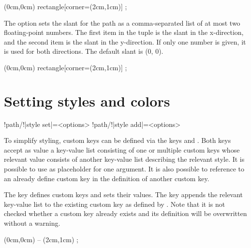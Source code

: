 \documentclass[a4paper]{article}
\begin{document}
{{\begin{codeexamplecolumns}
\begin{qdraw}
  \stroke[rotate={20}]
    (0cm,0cm) rectangle[corner={(2cm,1cm)}] ;
\end{qdraw}
\end{codeexamplecolumns}

The option  sets the slant for the path as a comma-separated list of at most two floating-point numbers. The first item in the tuple is the slant in the x-direction, and the second item is the slant in the y-direction. If only one number is given, it is used for both directions. The default slant is (\num{0}, \num{0}).

\begin{codeexamplecolumns}
\begin{qdraw}
  \stroke[slant={0.25,0.5}]
    (0cm,0cm) rectangle[corner={(2cm,1cm)}] ;
\end{qdraw}
\end{codeexamplecolumns}

\section{Setting styles and colors}

\begin{macrodef}
!path/!|style set|={<options>}
!path/!|style add|={<options>}
\end{macrodef}
To simplify styling, custom keys can be defined via the keys  and . Both keys accept as value a key-value list consisting of one or multiple custom keys whose relevant value consists of another key-value list describing the relevant style. It is possible to use  as placeholder for one argument. It is also possible to reference to an already define custom key in the definition of another custom key.

The key  defines custom keys and sets their values. The key  appends the relevant key-value list to the existing custom key as defined by . Note that it is not checked whether a custom key already exists and its definition will be overwritten without a warning.

\begin{codeexamplecolumns}
\begin{qdraw}[
  style set={
    mystyle={
      stroke, stroke color={blue},
      line width={5pt}
    }
  }
]
  \path[mystyle]
    (0cm,0cm) -- (2cm,1cm) ;
\end{qdraw}
\end{codeexamplecolumns}

}}
\end{document}
